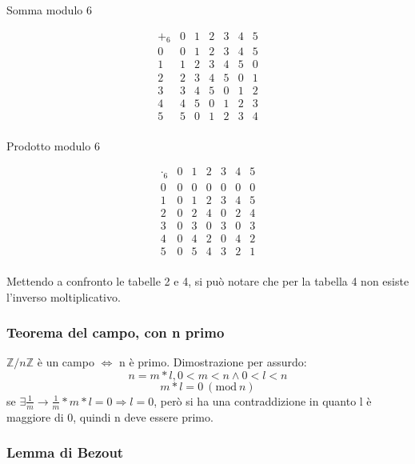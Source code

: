 \documentclass[a4paper,12pt]{article}
\newcommand{\Mod}[1]{\ (\mathrm{mod}\ #1)}
\begin{document}
	\begin{table}[h!]
		\centering
		\begin{minipage}{0.45\textwidth}
			\centering
			\caption*{Somma modulo 6}
			\[
			\begin{array}{c|cccccc}
				+_6 & 0 & 1 & 2 & 3 & 4 & 5 \\
				\hline
				0 & 0 & 1 & 2 & 3 & 4 & 5 \\
				1 & 1 & 2 & 3 & 4 & 5 & 0 \\
				2 & 2 & 3 & 4 & 5 & 0 & 1 \\
				3 & 3 & 4 & 5 & 0 & 1 & 2 \\
				4 & 4 & 5 & 0 & 1 & 2 & 3 \\
				5 & 5 & 0 & 1 & 2 & 3 & 4 \\
			\end{array}
			\]
		\end{minipage}
		\hfill
		\begin{minipage}{0.45\textwidth}
			\centering
			\caption*{Prodotto modulo 6}
			\[
			\begin{array}{c|cccccc}
				\cdot_6 & 0 & 1 & 2 & 3 & 4 & 5 \\
				\hline
				0 & 0 & 0 & 0 & 0 & 0 & 0 \\
				1 & 0 & 1 & 2 & 3 & 4 & 5 \\
				2 & 0 & 2 & 4 & 0 & 2 & 4 \\
				3 & 0 & 3 & 0 & 3 & 0 & 3 \\
				4 & 0 & 4 & 2 & 0 & 4 & 2 \\
				5 & 0 & 5 & 4 & 3 & 2 & 1 \\
			\end{array}
			\]
		\end{minipage}
	\end{table}	
	Mettendo a confronto le tabelle 2 e 4, si può notare che per la tabella 4 non esiste l'inverso moltiplicativo.
	
	\subsubsection{Teorema del campo, con n primo}
	$\mathbb{Z}/n\mathbb{Z}$ è un campo $\iff$ n è primo.
	Dimostrazione per assurdo:
	\[n = m*l, 0 < m < n \wedge 0<l<n\]
	\[m*l = 0 \Mod{n}\]
	se $\exists \frac{1}{m} \rightarrow \frac{1}{m} * m *l = 0 \Rightarrow l = 0$, però si ha una contraddizione in quanto  l è maggiore di 0, quindi n deve essere primo.
	
	\subsubsection{Lemma di Bezout}
	
\end{document}
